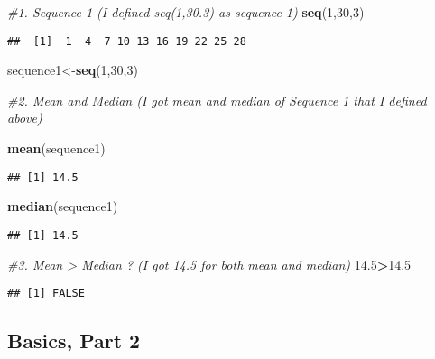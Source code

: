 \documentclass[
]{article}
\newenvironment{Shaded}{\begin{snugshade}}{\end{snugshade}}
\newcommand{\CommentTok}[1]{\textcolor[rgb]{0.56,0.35,0.01}{\textit{#1}}}
\newcommand{\DecValTok}[1]{\textcolor[rgb]{0.00,0.00,0.81}{#1}}
\newcommand{\FloatTok}[1]{\textcolor[rgb]{0.00,0.00,0.81}{#1}}
\newcommand{\FunctionTok}[1]{\textcolor[rgb]{0.13,0.29,0.53}{\textbf{#1}}}
\newcommand{\NormalTok}[1]{#1}
\newcommand{\OtherTok}[1]{\textcolor[rgb]{0.56,0.35,0.01}{#1}}
\newcommand{\SpecialCharTok}[1]{\textcolor[rgb]{0.81,0.36,0.00}{\textbf{#1}}}
\begin{document}
\begin{Shaded}
\begin{Highlighting}[]
\CommentTok{\#1. Sequence 1 (I defined seq(1,30.3) as sequence 1)}
\FunctionTok{seq}\NormalTok{(}\DecValTok{1}\NormalTok{,}\DecValTok{30}\NormalTok{,}\DecValTok{3}\NormalTok{)}
\end{Highlighting}
\end{Shaded}

\begin{verbatim}
##  [1]  1  4  7 10 13 16 19 22 25 28
\end{verbatim}

\begin{Shaded}
\begin{Highlighting}[]
\NormalTok{sequence1}\OtherTok{\textless{}{-}}\FunctionTok{seq}\NormalTok{(}\DecValTok{1}\NormalTok{,}\DecValTok{30}\NormalTok{,}\DecValTok{3}\NormalTok{)}


\CommentTok{\#2. Mean and Median (I got mean and median of Sequence 1 that I defined above)}

\FunctionTok{mean}\NormalTok{(sequence1)}
\end{Highlighting}
\end{Shaded}

\begin{verbatim}
## [1] 14.5
\end{verbatim}

\begin{Shaded}
\begin{Highlighting}[]
\FunctionTok{median}\NormalTok{(sequence1)}
\end{Highlighting}
\end{Shaded}

\begin{verbatim}
## [1] 14.5
\end{verbatim}

\begin{Shaded}
\begin{Highlighting}[]
\CommentTok{\#3. Mean \textgreater{} Median ? (I got 14.5 for both mean and median)}
\FloatTok{14.5}\SpecialCharTok{\textgreater{}}\FloatTok{14.5}
\end{Highlighting}
\end{Shaded}

\begin{verbatim}
## [1] FALSE
\end{verbatim}

\hypertarget{basics-part-2}{%
\subsection{Basics, Part 2}\label{basics-part-2}}
\end{document}
